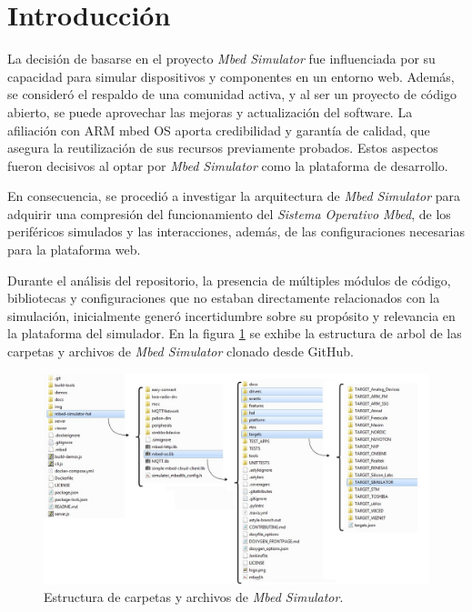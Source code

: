 \section{Introducción}

La decisión de basarse en el proyecto \textit{Mbed Simulator} fue influenciada por su capacidad para simular dispositivos y componentes en un entorno web. Además, se consideró el respaldo de una comunidad activa, y al ser un proyecto de código abierto, se puede aprovechar las mejoras y actualización del software. La afiliación con ARM mbed OS aporta credibilidad y garantía de calidad, que asegura la reutilización de sus recursos previamente probados. Estos aspectos fueron decisivos al optar por \textit{Mbed Simulator} como la plataforma de desarrollo.

En consecuencia, se procedió a investigar la arquitectura de \textit{Mbed Simulator} para adquirir una compresión del funcionamiento del \textit{Sistema Operativo Mbed}, de los periféricos simulados y las interacciones, además, de las configuraciones necesarias para la plataforma web.

Durante el análisis del repositorio, la presencia de múltiples módulos de código, bibliotecas y configuraciones que no estaban directamente relacionados con la simulación, inicialmente generó incertidumbre sobre su propósito y relevancia en la plataforma del simulador. En la figura \ref{fig:estructuraMbed} se exhibe la estructura de arbol de las carpetas y archivos de  \textit{Mbed Simulator} clonado desde GitHub.

\hfill \break
\hfill \break
\hfill \break
\hfill \break
\hfill \break
\hfill \break
\hfill \break
\hfill \break
\hfill \break
\hfill \break
\hfill \break
\hfill \break
\hfill \break

\begin{figure}[ht]
	\centering
	\includegraphics[scale=.35]{./Figures/estructuraMbed.jpg}
	\caption{Estructura de carpetas y archivos de \textit{Mbed Simulator}.}
	\label{fig:estructuraMbed}
\end{figure}
 
